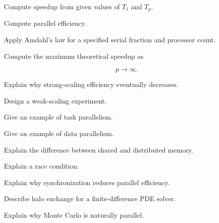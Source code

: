 \begin{exercise}[2]
Compute speedup from given values of \(T_1\) and \(T_p\).
\end{exercise}

\begin{exercise}[2]
Compute parallel efficiency.
\end{exercise}

\begin{exercise}[3]
Apply Amdahl's law for a specified serial fraction and processor count.
\end{exercise}

\begin{exercise}[3]
Compute the maximum theoretical speedup as

\[
p\to\infty.
\]
\end{exercise}

\begin{exercise}[3]
Explain why strong-scaling efficiency eventually decreases.
\end{exercise}

\begin{exercise}[3]
Design a weak-scaling experiment.
\end{exercise}

\begin{exercise}[3]
Give an example of task parallelism.
\end{exercise}

\begin{exercise}[3]
Give an example of data parallelism.
\end{exercise}

\begin{exercise}[3]
Explain the difference between shared and distributed memory.
\end{exercise}

\begin{exercise}[3]
Explain a race condition.
\end{exercise}

\begin{exercise}[3]
Explain why synchronization reduces parallel efficiency.
\end{exercise}

\begin{exercise}[3]
Describe halo exchange for a finite-difference PDE solver.
\end{exercise}

\begin{exercise}[3]
Explain why Monte Carlo is naturally parallel.
\end{exercise}

